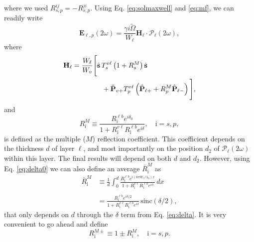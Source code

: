\documentclass[aps,pra,10pt,amsmath,twocolumn,letterpaper]{revtex4-1}
\begin{document}
where we used $R^{ij}_{s,p} = -R^{ji}_{s,p}$. Using Eq. \eqref{eq:solmaxwell}
and \eqref{eq:mf}, we can readily write
\begin{equation}\label{eq:mr8}
\mathbf{E}_{\ell,p}(2\omega) =
\frac{\gamma i\tilde{\Omega}}{W_{\ell}}\mathbf{H}_{\ell}\cdot
\boldsymbol{\mathcal{P}}_{\ell}(2\omega),
\end{equation}
where
\begin{equation}\label{eq:mr9}
\begin{split}
\mathbf{H}_{\ell}
&= \frac{W_\ell}{W_v}
\Bigg[
\hat{\mathbf{s}}\,T_{s}^{v\ell}
\left(1+ R^{M}_{s}\right)\hat{\mathbf{s}}\\
&\hspace{1.5cm}+ \hat{\mathbf{P}}_{v+}T_{p}^{v\ell}
\left(\hat{\mathbf{P}}_{\ell +} + R^{M}_{p}\hat{\mathbf{P}}_{\ell -}\right)
\Bigg],
\end{split}
\end{equation}
and
\begin{equation}\label{m61}
R^{M}_{\mathrm{i}}\equiv
\frac{R^{\ell b}_{\mathrm{i}}e^{i\delta_{0}}}
     {1+R^{v\ell}_{\mathrm{i}} R^{\ell b}_{\mathrm{i}}e^{i\delta}},
     \quad \mathrm{i}=s,p,
\end{equation}
is defined as the multiple ($M$) reflection coefficient. This coefficient
depends on the thickness $d$ of layer $\ell$, and most importantly on the
position $d_{2}$ of $\boldsymbol{\mathcal{P}}_{\ell}(2\omega)$ within this
layer. The final results will depend on both $d$ and $d_{2}$. However, using Eq.
\eqref{eq:delta0} we can also define an average $\bar{R}^{M}_{\mathrm{i}}$ as
\begin{equation*}\label{eq:mcave}
\begin{split}
\bar{R}^{M}_{\mathrm{i}}
&\equiv
\frac{1}{d}\int_{0}^{d}
\frac{R^{\ell b}_{\mathrm{i}}e^{i(8\pi W_{\ell}/\lambda_{0})x}}
{1 + R^{v\ell}_{\mathrm{i}}R^{\ell b}_{\mathrm{i}}e^{i\delta}}\,dx\\\\
&= \frac{R^{\ell b}_{\mathrm{i}}e^{i\delta/2}}
{1 + R^{v\ell}_{\mathrm{i}}R^{\ell b}_{\mathrm{i}}e^{i\delta}}
\,\mathrm{sinc}(\delta/2),
\end{split}
\end{equation*}
that only depends on $d$ through the $\delta$ term from Eq. \eqref{eq:delta}. It
is very convenient to go ahead and define
\begin{equation}\label{eq:rm}
R^{M\pm}_{\mathrm{i}}\equiv 1 \pm R^{M}_{\mathrm{i}}, \quad \mathrm{i}=s,p.
\end{equation}
\end{document}
